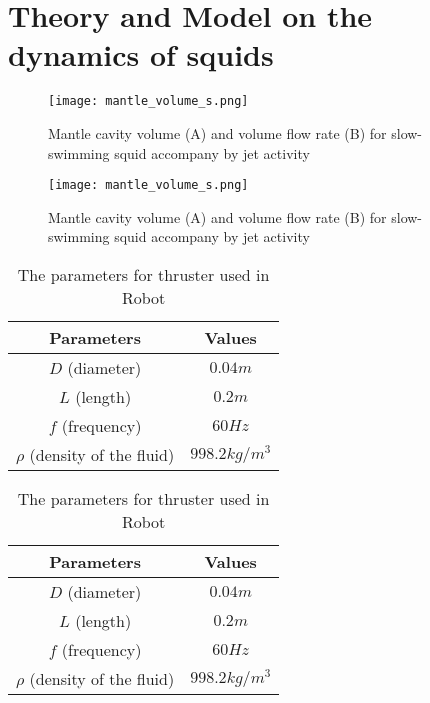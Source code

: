 \documentclass[main.tex]{subfiles}
\begin{document}
\section{Theory and Model on the dynamics of squids}

\lipsum[1-2]

\begin{figure}[h]
    \centering
    \texttt{[image: mantle\_volume\_s.png]}
    \caption{Mantle cavity volume (A) and volume flow rate (B) for slow-swimming squid accompany by jet activity\cite{Anderson2000}}
\end{figure}

\begin{figure}[h]
    \centering
    \texttt{[image: mantle\_volume\_s.png]}
    \caption{Mantle cavity volume (A) and volume flow rate (B) for slow-swimming squid accompany by jet activity\cite{Anderson2000}}
\end{figure}

\begin{table}[h]
    \centering
    \begin{tabular}{|c|c|}
    \hline
    Parameters                    & Values         \\ \hline
    $D$ (diameter)                & $0.04m$        \\ \hline
    $L$ (length)                  & $0.2m$         \\ \hline
    $f$ (frequency)               & $60Hz$         \\ \hline
    $\rho$ (density of the fluid) & $998.2 kg/m^3$ \\ \hline
    \end{tabular}
    \caption{The parameters for thruster used in Robot}
\end{table}

\begin{table}[h]
    \centering
    \begin{tabular}{|c|c|}
    \hline
    Parameters                    & Values         \\ \hline
    $D$ (diameter)                & $0.04m$        \\ \hline
    $L$ (length)                  & $0.2m$         \\ \hline
    $f$ (frequency)               & $60Hz$         \\ \hline
    $\rho$ (density of the fluid) & $998.2 kg/m^3$ \\ \hline
    \end{tabular}
    \caption{The parameters for thruster used in Robot}
\end{table}
\end{document}
